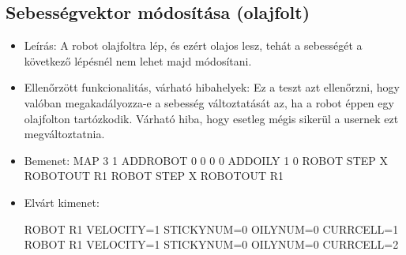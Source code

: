 \subsection{Sebességvektor módosítása (olajfolt)}
\begin{itemize}
	\item Leírás: \newline
	A robot olajfoltra lép, és ezért olajos lesz, tehát a sebességét a következő lépésnél nem lehet majd módosítani.
	\item Ellenőrzött funkcionalitás, várható hibahelyek: \newline 
	Ez a teszt azt ellenőrzni, hogy valóban megakadályozza-e a sebesség változtatását az, ha a robot éppen egy olajfolton tartózkodik. Várható hiba, hogy esetleg mégis sikerül a usernek ezt megváltoztatnia.
	\item Bemenet: \newline
		MAP 3 1 \newline
		ADDROBOT 0 0 0 0 \newline
		ADDOILY 1 0 \newline
		ROBOT STEP X \newline
		ROBOTOUT R1 \newline
		ROBOT STEP X \newline
		ROBOTOUT R1 \newline
	\item Elvárt kimenet: \newline
	
		ROBOT R1 VELOCITY=1 STICKYNUM=0 OILYNUM=0 CURRCELL=1 \newline
		ROBOT R1 VELOCITY=1 STICKYNUM=0 OILYNUM=0 CURRCELL=2 \newline
		
\end{itemize}

